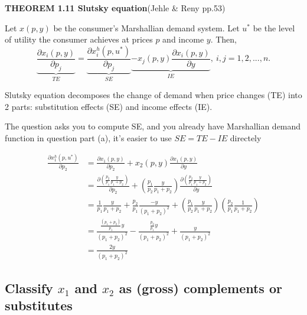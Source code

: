 \documentclass{article}
\begin{document}
\begin{mdframed}[backgroundcolor=blue!20,linecolor=white]
\textbf{THEOREM 1.11 Slutsky equation}(Jehle \& Reny pp.53)

Let $x(p, y)$ be the consumer’s Marshallian demand system. Let $u^*$ be the level of utility the consumer achieves at prices $p$ and income $y$. Then,
$$\underbrace{\frac{\partial x_i(p,y)}{\partial p_j}}_{TE} = \underbrace{\frac{\partial x_i^h(p,u^*)}{\partial p_j}}_{SE} \underbrace{- x_j(p,y)\frac{\partial x_i(p,y)}{\partial y}}_{IE} , \  i,j = 1,2,...,n.$$

Slutsky equation decomposes the change of demand when price changes (TE) into
2 parts: substitution effects (SE) and income effects (IE).

The question asks you to compute SE, and you already have Marshallian demand function in question part (a), it's easier to use $SE = TE - IE$ directely

\end{mdframed}

\begin{align*}
\frac{\partial x_1^h(p,u^*)}{\partial p_2} &= \frac{\partial x_1(p,y)}{\partial p_2} + x_2(p,y)\frac{\partial x_1(p,y)}{\partial y} \\
&= \frac{\partial (\frac{p_2}{p_1}\frac{y}{p_1 + p_2})}{\partial p_2} + (\frac{p_1}{p_2}\frac{y}{p_1 + p_2})\frac{\partial (\frac{p_2}{p_1}\frac{y}{p_1 + p_2})}{\partial y} \\
&= \frac{1}{p_1}\frac{y}{p_1 + p_2} + \frac{p_2}{p_1}\frac{-y}{(p_1 + p_2)^2} + (\frac{p_1}{p_2}\frac{y}{p_1 + p_2})(\frac{p_2}{p_1}\frac{1}{p_1 + p_2}) \\
&=\frac{\frac{(p_1+p_2)}{p_1} y}{(p_1 + p_2)^2} - \frac{\frac{p_2}{p_1}y}{(p_1 + p_2)^2} +\frac{y}{(p_1 + p_2)^2} \\
&=\frac{2y}{(p_1 + p_2)^2} 
\end{align*}

\subsection{Classify $x_1$ and $x_2$ as (gross) complements or substitutes}
\end{document}
